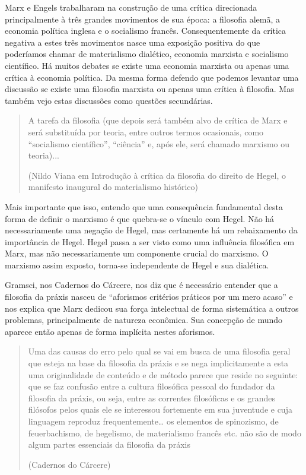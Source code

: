 Marx e Engels trabalharam na construção de uma crítica direcionada principalmente à três grandes movimentos de sua época: a filosofia alemã, a economia política inglesa e o socialismo francês. Consequentemente da crítica negativa a estes três movimentos nasce uma exposição positiva do que poderíamos chamar de materialismo dialético, economia marxista e socialismo científico. Há muitos debates se existe uma economia marxista ou apenas uma crítica à economia política. Da mesma forma defendo que podemos levantar uma discussão se existe uma filosofia marxista ou apenas uma crítica à filosofia. Mas também vejo estas discussões como questões secundárias.

\begin{quote}
A tarefa da filosofia (que depois será também alvo de crítica de Marx e será substituída por teoria, entre outros termos ocasionais, como “socialismo científico”, “ciência” e, após ele, será chamado marxismo ou teoria)...

(Nildo Viana em Introdução à crítica da filosofia do direito de Hegel, o manifesto inaugural do materialismo histórico)
\end{quote}

Mais importante que isso, entendo que uma consequência fundamental desta forma de definir o marxismo é que quebra-se o vínculo com Hegel. Não há necessariamente uma negação de Hegel, mas certamente há um rebaixamento da importância de Hegel. Hegel passa a ser visto como uma influência filosófica em Marx, mas não necessariamente um componente crucial do marxismo. O marxismo assim exposto, torna-se independente de Hegel e sua dialética.

Gramsci, nos Cadernos do Cárcere, nos diz que é necessário entender que a filosofia da práxis nasceu de “aforismos critérios práticos por um mero acaso” e nos explica que Marx dedicou sua força intelectual de forma sistemática a outros problemas, principalmente de natureza econômica. Sua concepção de mundo aparece então apenas de forma implícita nestes aforismos.

\begin{quote}
Uma das causas do erro pelo qual se vai em busca de uma filosofia geral que esteja na base da filosofia da práxis e se nega implicitamente a esta uma originalidade de conteúdo e de método parece que reside no seguinte: que se faz confusão entre a cultura filosófica pessoal do fundador da filosofia da práxis, ou seja, entre as correntes filosóficas e os grandes filósofos pelos quais ele se interessou fortemente em sua juventude e cuja linguagem reproduz frequentemente… os elementos de spinozismo, de feuerbachismo, de hegelismo, de materialismo francês etc. não são de modo algum partes essenciais da filosofia da práxis

(Cadernos do Cárcere)
\end{quote}

